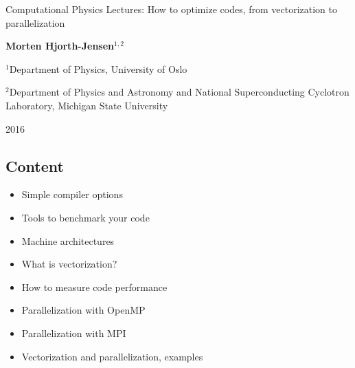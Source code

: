 \documentclass[%
oneside,                 %
final,                   %
10pt]{article}
\begin{document}

\newcommand{\exercisesection}[1]{\subsection*{#1}}






\thispagestyle{empty}

\begin{center}
{\LARGE\bf
\begin{spacing}{1.25}
Computational Physics Lectures: How to optimize codes, from vectorization to parallelization
\end{spacing}
}
\end{center}


\begin{center}
{\bf Morten Hjorth-Jensen${}^{1, 2}$} \\ [0mm]
\end{center}

\begin{center}
\centerline{{\small ${}^1$Department of Physics, University of Oslo}}
\centerline{{\small ${}^2$Department of Physics and Astronomy and National Superconducting Cyclotron Laboratory, Michigan State University}}
\end{center}
    

\begin{center}
2016
\end{center}

\vspace{1cm}


\subsection*{Content}
\begin{itemize}
\item Simple compiler options 

\item Tools to benchmark your code

\item Machine architectures

\item What is vectorization?

\item How to measure code performance

\item Parallelization with OpenMP

\item Parallelization with MPI

\item Vectorization and parallelization, examples
\end{itemize}
\end{document}
